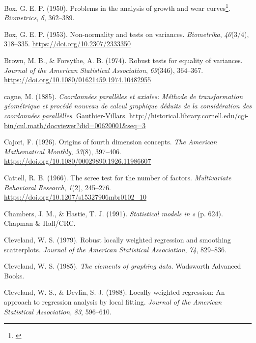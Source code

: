 \documentclass[
  letterpaper,
  10pt,
  krantz2]{krantz}
\newlength{\cslhangindent}
\newlength{\cslentryspacingunit} %
\newenvironment{CSLReferences}[2] %
 {%
  \setlength{\parindent}{0pt}
  \ifodd #1
  \let\oldpar\par
  \def\par{\hangindent=\cslhangindent\oldpar}
  \fi
  \setlength{\parskip}{#2\cslentryspacingunit}
 }%
 {}
\providecommand{\href}[2]{#2\footnote{\url{#1}}}
\begin{document}
\begin{CSLReferences}{1}{0}
\leavevmode{}%
Box, G. E. P. (1950). \href{}{Problems in the analysis of growth and
wear curves}. \emph{Biometrics}, \emph{6}, 362--389.

\leavevmode{}%
Box, G. E. P. (1953). Non-normality and tests on variances.
\emph{Biometrika}, \emph{40}(3/4), 318--335.
\url{https://doi.org/10.2307/2333350}

\leavevmode{}%
Brown, M. B., \& Forsythe, A. B. (1974). Robust tests for equality of
variances. \emph{Journal of the American Statistical Association},
\emph{69}(346), 364--367.
\url{https://doi.org/10.1080/01621459.1974.10482955}

\leavevmode{}%
cagne, M. (1885). \emph{Coordonn{é}es parall{è}les et axiales: M{é}thode
de transformation g{é}om{é}trique et proc{é}d{é} nouveau de calcul
graphique d{é}duits de la consid{é}ration des coordonn{é}es
parall{è}lles}. Gauthier-Villars.
\url{http://historical.library.cornell.edu/cgi-bin/cul.math/docviewer?did=00620001\&seq=3}

\leavevmode{}%
Cajori, F. (1926). Origins of fourth dimension concepts. \emph{The
American Mathematical Monthly}, \emph{33}(8), 397--406.
\url{https://doi.org/10.1080/00029890.1926.11986607}

\leavevmode{}%
Cattell, R. B. (1966). The scree test for the number of factors.
\emph{Multivariate Behavioral Research}, \emph{1}(2), 245--276.
\url{https://doi.org/10.1207/s15327906mbr0102_10}

\leavevmode{}%
Chambers, J. M., \& Hastie, T. J. (1991). \emph{Statistical models in s}
(p. 624). Chapman \& Hall/CRC.

\leavevmode{}%
Cleveland, W. S. (1979). Robust locally weighted regression and
smoothing scatterplots. \emph{Journal of the American Statistical
Association}, \emph{74}, 829--836.

\leavevmode{}%
Cleveland, W. S. (1985). \emph{The elements of graphing data}. Wadsworth
Advanced Books.

\leavevmode{}%
Cleveland, W. S., \& Devlin, S. J. (1988). Locally weighted regression:
An approach to regression analysis by local fitting. \emph{Journal of
the American Statistical Association}, \emph{83}, 596--610.


\end{CSLReferences}
\end{document}
